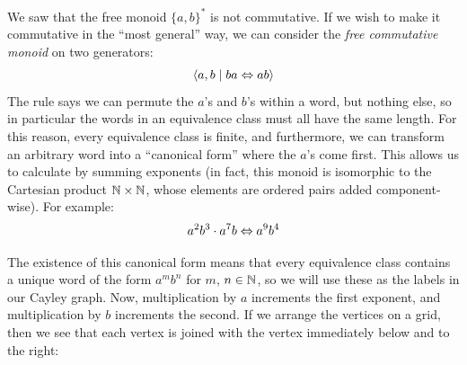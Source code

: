 \documentclass[../generics]{subfiles}
\begin{document}
\begin{example}\label{commutative free monoid example}
We saw that the free monoid $\{a,b\}^*$ is not commutative. If we wish to make it commutative in the ``most general'' way, we can consider the \emph{free commutative monoid} on two generators:
\[\langle a,b \mid ba\Leftrightarrow ab\rangle\]
The rule says we can permute the $a$'s and $b$'s within a word, but nothing else, so in particular the words in an equivalence class must all have the same length. For this reason, every equivalence class is finite, and furthermore, we can transform an arbitrary word into a ``canonical form'' where the $a$'s come first. This allows us to calculate by summing exponents (in fact, this monoid is isomorphic to the Cartesian product $\mathbb{N}\times\mathbb{N}$, whose elements are ordered pairs added component-wise). For example:
\[a^2 b^3 \cdot a^7 b \Leftrightarrow a^9 b^4\]

The existence of this canonical form means that every equivalence class contains a unique word of the form $a^mb^n$ for $m$, $n\in\mathbb{N}$, so we will use these as the labels in our Cayley graph. Now, multiplication by $a$ increments the first exponent, and multiplication by $b$ increments the second. If we arrange the vertices on a grid, then we see that each vertex is joined with the vertex immediately below and to the right:

\begin{center}
\end{center}
\end{example}
\end{document}
